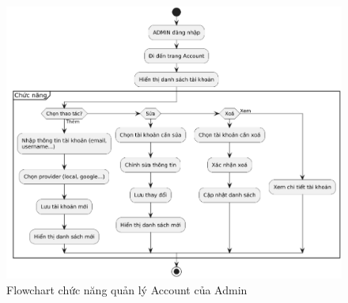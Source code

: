 \begin{figure}
    \centering
    \includegraphics[width=1\linewidth]{images/flowchart-admin-account.png}
    \caption{Flowchart chức năng quản lý Account của Admin}
    \label{fig:flowchart-admin-account}
\end{figure}